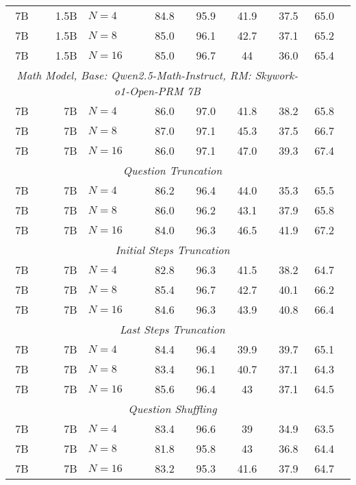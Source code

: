 \documentclass{article}
\begin{document}
\begin{table*}[!ht]
\begin{center}
\begin{tabular}{crlcccccl}
 7B & 1.5B & $N=4$ & 84.8 & 95.9 & 41.9 & 37.5 & 65.0\\
 7B & 1.5B & $N=8$ & 85.0 & 96.1 & 42.7 & 37.1 & 65.2\\
 7B & 1.5B & $N=16$ & 85.0 & 96.7 & 44 & 36.0 & 65.4\\
\midrule
\multicolumn{7}{c}{\textit{Math Model, Base: Qwen2.5-Math-Instruct, RM: Skywork-
o1-Open-PRM 7B}} \\
\midrule
 7B & 7B & $N=4$ & 86.0 & 97.0 & 41.8 & 38.2 & 65.8\\
 7B & 7B & $N=8$ & 87.0 & 97.1 & 45.3 & 37.5& 66.7\\
 7B & 7B & $N=16$ & 86.0 & 97.1 & 47.0 & 39.3 & 67.4\\
\cmidrule(lr){1-8}
\multicolumn{8}{c}{\textit{Question Truncation}} \\
 7B & 7B & $N=4$ & 86.2 & 96.4 & 44.0 & 35.3 & 65.5\\
 7B & 7B & $N=8$ & 86.0 & 96.2 & 43.1 & 37.9 & 65.8\\
 7B & 7B & $N=16$ & 84.0 & 96.3 & 46.5 & 41.9 & 67.2\\
\multicolumn{8}{c}{\textit{Initial Steps Truncation}} \\
 7B & 7B & $N=4$ & 82.8 & 96.3 & 41.5 & 38.2 & 64.7\\
 7B & 7B & $N=8$ & 85.4 & 96.7 & 42.7 & 40.1 & 66.2\\
 7B & 7B & $N=16$ & 84.6 & 96.3 & 43.9 & 40.8 & 66.4\\
\multicolumn{8}{c}{\textit{Last Steps Truncation}} \\
 7B & 7B & $N=4$ & 84.4 & 96.4 & 39.9 & 39.7 & 65.1\\
 7B & 7B & $N=8$ & 83.4 & 96.1	& 40.7 & 37.1 & 64.3\\
 7B & 7B & $N=16$ & 85.6 & 96.4 & 43 & 37.1 & 64.5\\
\multicolumn{8}{c}{\textit{Question Shuffling}} \\
 7B & 7B & $N=4$ & 83.4 & 96.6 & 39 & 34.9 & 63.5\\
 7B & 7B & $N=8$ & 81.8 & 95.8 & 43 & 36.8 & 64.4\\
 7B & 7B & $N=16$ & 83.2 & 95.3 & 41.6	& 37.9 & 64.7\\
\bottomrule
\end{tabular}
\end{center}
\vskip -0.2in
\end{table*}
\end{document}
